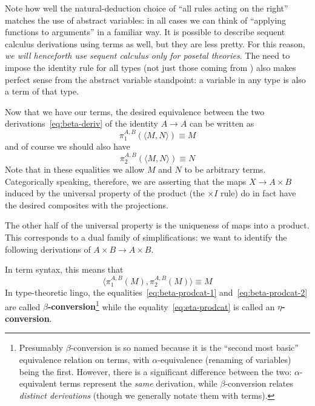 \documentclass{book}
\let\types\vdash
\def\timesI{\ensuremath{\mathord{\times}I}}
\def\pair#1#2{\langle #1,#2\rangle}
\def\pr#1#2#3{\pi_{#1}^{#2,#3}}
\begin{document}
Note how well the natural-deduction choice of ``all rules acting on the right'' matches the use of abstract variables: in all cases we can think of ``applying functions to arguments'' in a familiar way.
It is possible to describe sequent calculus derivations using terms as well, but they are less pretty.
For this reason, \emph{we will henceforth use sequent calculus only for posetal theories}.
The need to impose the identity rule for all types (not just those coming from \cG) also makes perfect sense from the abstract variable standpoint: a variable in any type is also a term of that type.

Now that we have our terms, the desired equivalence between the two derivations~\eqref{eq:beta-deriv} of the identity $A\to A$ can be written as
\begin{equation}
  \pr1AB(\pair M N) \equiv M\label{eq:beta-prodcat-1}
\end{equation}
and of course we should also have
\begin{equation}
  \pr2AB(\pair M N) \equiv N\label{eq:beta-prodcat-2}
\end{equation}
Note that in these equalities we allow $M$ and $N$ to be arbitrary terms.
Categorically speaking, therefore, we are asserting that the maps $X\to A\times B$ induced by the universal property of the product (the $\timesI$ rule) do in fact have the desired composites with the projections.

The other half of the universal property is the uniqueness of maps into a product.
This corresponds to a dual family of simplifications: we want to identify the following derivations of $A\times B\to A\times B$.
In term syntax, this means that
\begin{equation}
  \pair{\pr1AB(M)}{\pr2AB(M)} \equiv M\label{eq:eta-prodcat}
\end{equation}
In type-theoretic lingo, the equalities~\eqref{eq:beta-prodcat-1} and~\eqref{eq:beta-prodcat-2} are called \textbf{$\beta$-conversion}\footnote{Presumably $\beta$-conversion is so named because it is the ``second most basic'' equivalence relation on terms, with $\alpha$-equivalence (renaming of variables) being the first.
However, there is a significant difference between the two: $\alpha$-equivalent terms represent the \emph{same} derivation, while $\beta$-conversion relates \emph{distinct derivations} (though we generally notate them with terms).} while the equality~\eqref{eq:eta-prodcat} is called an \textbf{$\eta$-conversion}.
\end{document}
